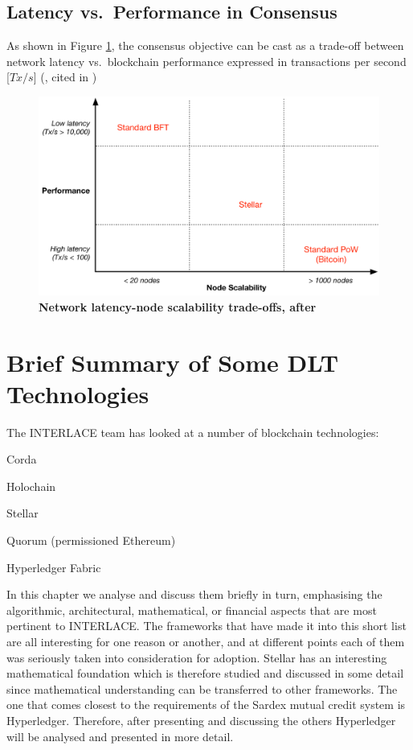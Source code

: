 \subsection{Latency vs.\ Performance in Consensus}
As shown in Figure \ref{fig:consensus_tradeoffs}, the consensus objective can be cast as a trade-off between network latency vs.\ blockchain performance expressed in transactions per second [$Tx/s$] (\cite{vukolic2015}, cited in \cite{AndroulakiEtAl2018})




\begin{figure}[h]
\centering
\includegraphics[width=14 cm]{Figures/consensus_tradeoffs}
\caption{\bf \small Network latency-node scalability trade-offs, after \cite{vukolic2015}}
\label{fig:consensus_tradeoffs}
\end{figure}









\section{Brief Summary of Some DLT Technologies}

The INTERLACE team has looked at a number of blockchain technologies:
\begin{packed_item1}
\item Corda
\item Holochain
\item Stellar
\item Quorum (permissioned Ethereum)
\item Hyperledger Fabric
\end{packed_item1}
In this chapter we analyse and discuss them briefly in turn, emphasising the algorithmic, architectural,  mathematical, or financial aspects that are most pertinent to INTERLACE. The frameworks that have made it into this short list are all interesting for one reason or another, and at different points each of them was seriously taken into consideration for adoption. Stellar has an interesting mathematical foundation which is therefore studied and discussed in some detail since mathematical understanding can be transferred to other frameworks. The one that comes closest to the requirements of the Sardex mutual credit system is Hyperledger. Therefore, after presenting and discussing the others Hyperledger will be analysed and presented in more detail.


